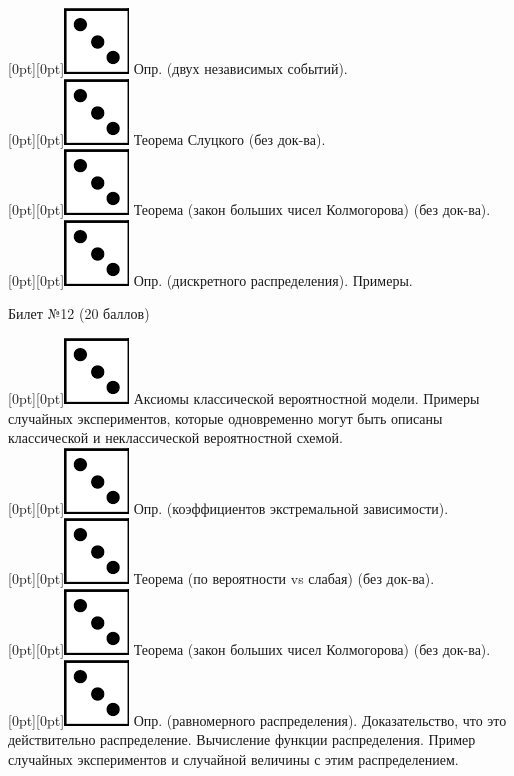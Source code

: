 \documentclass[preview]{standalone}
\begin{document}
\raisebox{-1pt}[0pt][0pt]{\includegraphics[width=0.02\linewidth]{3.png}} Опр. (двух независимых событий). \\
\raisebox{-1pt}[0pt][0pt]{\includegraphics[width=0.02\linewidth]{3.png}} Теорема Слуцкого (без док-ва). \\
\raisebox{-1pt}[0pt][0pt]{\includegraphics[width=0.02\linewidth]{3.png}} Теорема (закон больших чисел Колмогорова) (без док-ва). \\
\raisebox{-1pt}[0pt][0pt]{\includegraphics[width=0.02\linewidth]{3.png}} Опр. (дискретного распределения). Примеры. \\
\begin{center} {\Large Билет №12 (20 баллов)} \end{center}
\raisebox{-1pt}[0pt][0pt]{\includegraphics[width=0.02\linewidth]{3.png}} Аксиомы классической вероятностной модели. Примеры случайных экспериментов, которые одновременно могут быть описаны классической и неклассической вероятностной схемой. \\
\raisebox{-1pt}[0pt][0pt]{\includegraphics[width=0.02\linewidth]{3.png}} Опр. (коэффициентов экстремальной зависимости). \\
\raisebox{-1pt}[0pt][0pt]{\includegraphics[width=0.02\linewidth]{3.png}} Теорема (по вероятности vs слабая) (без док-ва). \\  
\raisebox{-1pt}[0pt][0pt]{\includegraphics[width=0.02\linewidth]{3.png}} Теорема (закон больших чисел Колмогорова) (без док-ва). \\
\raisebox{-1pt}[0pt][0pt]{\includegraphics[width=0.02\linewidth]{3.png}}  Опр. (равномерного распределения). Доказательство, что это действительно распределение. Вычисление функции распределения. Пример случайных экспериментов и случайной величины с этим распределением. \\
\end{document}
